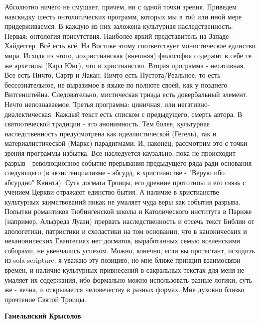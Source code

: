 \begin{itemize}
\begin{itemize}
Абсолютно ничего не смущает, причем, ни с одной точки зрения. Приведем
навскидку шесть онтологических программ, которых мы в той или иной мере
придерживаемся. В каждую из них заложена культурная наследственность. Первая:
онтология присутствия. Наиболее яркий представитель на Западе - Хайдеггер. Всё
есть всё. На Востоке этому соответствует монистическое единство мира. Исходя из
этого, дохристианская (внешняя) философия содержит в себе те же архетипы (Карл
Юнг), что и христианство. Вторая программа - негативная. Все есть Ничто, Сартр
и Лакан. Ничто есть Пустота/Реальное, то есть бессознательное, не выразимое в
языке по полноте своей, как у позднего Витгенштейна. Следовательно, мистическая
триада есть довербальный элемент. Нечто непознаваемое. Третья программа:
циничная, или негативно-диалектическая. Каждый текст есть списком с
предыдущего, смерть автора. В святоотеческой традиции - это анонимность. Тем
более, культурная наследственность предусмотрена как идеалистической (Гегель),
так и материалистической (Маркс) парадигмами. И, наконец, рассмотрим это с
точки зрения программы избытка. Все наследуется каузально, пока не происходит
разрыв - революционное событие прерывания предыдущего ряда ради основания
следующего (в экзистенциализме - абсурд, в христианстве - "Верую ибо абсурдно"
Квинта). Суть догмата Троицы, его древние прототипы и его связь с учением
Церкви отражают единство бытия. А наличие в христианстве культурных
заимствований никак не умаляет чуда веры как события разрыва. Попытки
романтиков Тюбингенской школы и Католического института в Париже (например,
Альфреда Луази) прервать наследственность и отсечь текст Библии от апологетики,
патристики и схоластики на том основании, что в канонических и неканонических
Евангелиях нет догматов, выработанных семью вселенскими соборами, не увенчались
успехом. Можно, конечно, если вы протестант, исходить из sola scripture, я
уважаю эту позицию, но мне ближе принцип взаимосвязи времён, и наличие
культурных привнесений в сакральных текстах для меня не умаляет их содержания,
ибо формально можно использовать разные логики, суть же - вечна, и открывается
человечеству в разных формах. Мне духовно близко прочтение Святой Троицы.

 
\textbf{Гамельнский Крысолов} 


\end{itemize}
\end{itemize}
